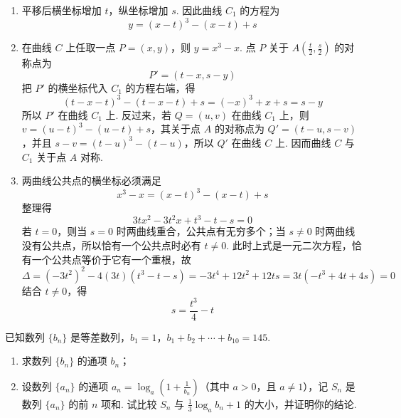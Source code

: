 \documentclass[UTF8,a4paper,oneside,11pt]{ctexbook}
\begin{document}
\begin{solution}
\begin{enumerate}
\item 平移后横坐标增加 \(t\)，纵坐标增加 \(s\). 因此曲线 \(C_{1}\) 的方程为
\[
y=(x-t)^{3}-(x-t)+s
\]

\item 在曲线 \(C\) 上任取一点 \(P=(x,y)\)，则 \(y=x^{3}-x\). 点 \(P\) 关于 \(A\left(\frac{t}{2},\frac{s}{2}\right)\) 的对称点为
\[
P'=(t-x,s-y)
\]
把 \(P'\) 的横坐标代入 \(C_{1}\) 的方程右端，得
\[
(t-x-t)^{3}-(t-x-t)+s=(-x)^{3}+x+s=s-y
\]
所以 \(P'\) 在曲线 \(C_{1}\) 上. 反过来，若 \(Q=(u,v)\) 在曲线 \(C_{1}\) 上，则 \(v=(u-t)^{3}-(u-t)+s\)，其关于点 \(A\) 的对称点为 \(Q'=(t-u,s-v)\)，并且 \(s-v=(t-u)^{3}-(t-u)\)，所以 \(Q'\) 在曲线 \(C\) 上. 因而曲线 \(C\) 与 \(C_{1}\) 关于点 \(A\) 对称.

\item 两曲线公共点的横坐标必须满足
\[
x^{3}-x=(x-t)^{3}-(x-t)+s
\]
整理得
\[
3tx^{2}-3t^{2}x+t^{3}-t-s=0
\]
若 \(t=0\)，则当 \(s=0\) 时两曲线重合，公共点有无穷多个；当 \(s\ne0\) 时两曲线没有公共点，所以恰有一个公共点时必有 \(t\ne0\). 此时上式是一元二次方程，恰有一个公共点等价于它有一个重根，故
\[
\Delta=(-3t^{2})^{2}-4(3t)(t^{3}-t-s)=-3t^{4}+12t^{2}+12ts=3t(-t^{3}+4t+4s)=0
\]
结合 \(t\ne0\)，得
\[
s=\frac{t^{3}}{4}-t
\]
\end{enumerate}
\end{solution}

\begin{problem}
已知数列 \(\{b_{n}\}\) 是等差数列，\(b_{1} = 1\)，\(b_{1} + b_{2} + \cdots + b_{10} = 145\).

\begin{enumerate}
\item 求数列 \(\{b_{n}\}\) 的通项 \(b_n\)；
\item 设数列 \(\{a_{n}\}\) 的通项 \(a_n = \log_a \left(1 + \frac{1}{b_n}\right)\)（其中 \(a > 0\)，且 \(a \neq 1\)），记 \(S_n\) 是数列 \(\{a_{n}\}\) 的前 \(n\) 项和. 试比较 \(S_n\) 与 \(\frac{1}{3}\log_a b_n + 1\) 的大小，并证明你的结论.
\end{enumerate}
\end{problem}
\end{document}
